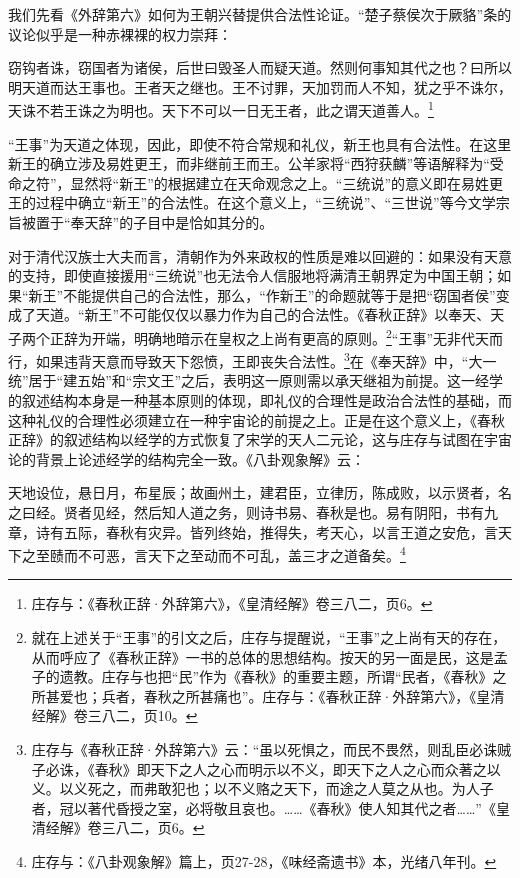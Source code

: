 \documentclass[a4paper, 12pt, openright]{ctexbook}
\renewenvironment{quote}
  {\list{}{\rightmargin2\ccwd \leftmargin2\ccwd \itemindent=2\ccwd \listparindent=2\ccwd}%
   \item\relax\small\kaishu\color{black}}
  {\endlist}
\begin{document}
我们先看《外辞第六》如何为王朝兴替提供合法性论证。“楚子蔡侯次于厥貉”条的议论似乎是一种赤裸裸的权力崇拜：

\begin{quote}
窃钩者诛，窃国者为诸侯，后世曰毁圣人而疑天道。然则何事知其代之也？曰所以明天道而达王事也。王者天之继也。王不讨罪，天加罚而人不知，犹之乎不诛尔，天诛不若王诛之为明也。天下不可以一日无王者，此之谓天道善人。\footnote{庄存与：《春秋正辞·外辞第六》，《皇清经解》卷三八二，页6。}
\end{quote}

“王事”为天道之体现，因此，即使不符合常规和礼仪，新王也具有合法性。在这里新王的确立涉及易姓更王，而非继前王而王。公羊家将“西狩获麟”等语解释为“受命之符”，显然将“新王”的根据建立在天命观念之上。“三统说”的意义即在易姓更王的过程中确立“新王”的合法性。在这个意义上，“三统说”、“三世说”等今文学宗旨被置于“奉天辞”的子目中是恰如其分的。

对于清代汉族士大夫而言，清朝作为外来政权的性质是难以回避的：如果没有天意的支持，即使直接援用“三统说”也无法令人信服地将满清王朝界定为中国王朝；如果“新王”不能提供自己的合法性，那么，“作新王”的命题就等于是把“窃国者侯”变成了天道。“新王”不可能仅仅以暴力作为自己的合法性。《春秋正辞》以奉天、天子两个正辞为开端，明确地暗示在皇权之上尚有更高的原则。\footnote{就在上述关于“王事”的引文之后，庄存与提醒说，“王事”之上尚有天的存在，从而呼应了《春秋正辞》一书的总体的思想结构。按天的另一面是民，这是孟子的遗教。庄存与也把“民”作为《春秋》的重要主题，所谓“民者，《春秋》之所甚爱也；兵者，春秋之所甚痛也”。庄存与：《春秋正辞·外辞第六》，《皇清经解》卷三八二，页10。}“王事”无非代天而行，如果违背天意而导致天下怨愤，王即丧失合法性。\footnote{庄存与《春秋正辞·外辞第六》云：“虽以死惧之，而民不畏然，则乱臣必诛贼子必诛，《春秋》即天下之人之心而明示以不义，即天下之人之心而众著之以义。以义死之，而弗敢犯也；以不义赂之天下，而途之人莫之从也。为人子者，冠以著代昏授之室，必将敬且哀也。……《春秋》使人知其代之者……”《皇清经解》卷三八二，页6。}在《奉天辞》中，“大一统”居于“建五始”和“宗文王”之后，表明这一原则需以承天继祖为前提。这一经学的叙述结构本身是一种基本原则的体现，即礼仪的合理性是政治合法性的基础，而这种礼仪的合理性必须建立在一种宇宙论的前提之上。正是在这个意义上，《春秋正辞》的叙述结构以经学的方式恢复了宋学的天人二元论，这与庄存与试图在宇宙论的背景上论述经学的结构完全一致。《八卦观象解》云：

\begin{quote}
天地设位，悬日月，布星辰；故画州土，建君臣，立律历，陈成败，以示贤者，名之曰经。贤者见经，然后知人道之务，则诗书易、春秋是也。易有阴阳，书有九章，诗有五际，春秋有灾异。皆列终始，推得失，考天心，以言王道之安危，言天下之至赜而不可恶，言天下之至动而不可乱，盖三才之道备矣。\footnote{庄存与：《八卦观象解》篇上，页27-28，《味经斋遗书》本，光绪八年刊。}
\end{quote}
\end{document}
